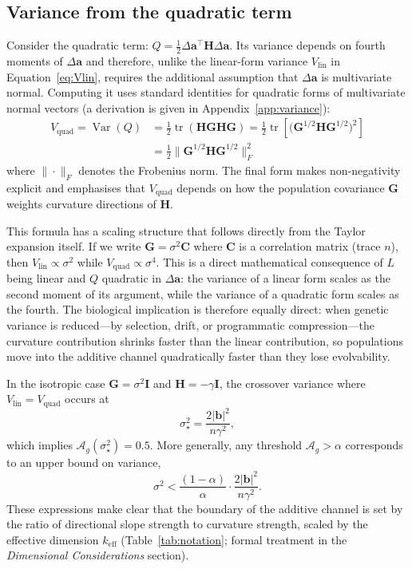 \documentclass[9pt,twocolumn,twoside,lineno]{gsajnl}
\newcommand{\vect}[1]{\boldsymbol{#1}}
\newcommand{\mat}[1]{\mathbf{#1}}
\newcommand{\tr}{\ensuremath{\operatorname{tr}}\xspace}
\newcommand{\Ag}{\ensuremath{\mathcal{A}_{g}}\xspace}
\newcommand{\Vlin}{\ensuremath{V_{\text{lin}}}\xspace}
\newcommand{\Vquad}{\ensuremath{V_{\text{quad}}}\xspace}
\newcommand{\keff}{\ensuremath{k_{\mathrm{eff}}}\xspace}
\newcommand{\Var}{\ensuremath{\operatorname{Var}}\xspace}
\begin{document}
\subsection{Variance from the quadratic term}

Consider the quadratic term: $Q = \tfrac{1}{2}\Delta\vect{a}^\top \mat{H} \Delta\vect{a}$. Its variance depends on fourth moments of $\Delta\vect{a}$ and therefore, unlike the linear-form variance $\Vlin$ in Equation~\eqref{eq:Vlin}, requires the additional assumption that $\Delta\vect{a}$ is multivariate normal. Computing it uses standard identities for quadratic forms of multivariate normal vectors \citep{MathaiProvost1992} (a derivation is given in Appendix~\ref{app:variance}):
\begin{equation}
\begin{split}
\Vquad = \Var(Q) &= \tfrac{1}{2}\tr(\mat{H}\mat{G}\mat{H}\mat{G})
= \tfrac{1}{2}\tr\!\left[\big(\mat{G}^{1/2}\mat{H}\mat{G}^{1/2}\big)^2\right] \\
&= \tfrac{1}{2}\big\|\mat{G}^{1/2}\mat{H}\mat{G}^{1/2}\big\|_F^2
\end{split}
\label{eq:Vquad}
\end{equation}
where $\|\cdot\|_F$ denotes the Frobenius norm. The final form makes non-negativity explicit and emphasises that $\Vquad$ depends on how the population covariance $\mat{G}$ weights curvature directions of $\mat{H}$.

This formula has a scaling structure that follows directly from the Taylor expansion itself. If we write $\mat{G} = \sigma^2 \mat{C}$ where $\mat{C}$ is a correlation matrix (trace $n$), then $\Vlin \propto \sigma^2$ while $\Vquad \propto \sigma^4$. This is a direct mathematical consequence of $L$ being linear and $Q$ quadratic in $\Delta\vect{a}$: the variance of a linear form scales as the second moment of its argument, while the variance of a quadratic form scales as the fourth. The biological implication is therefore equally direct: when genetic variance is reduced---by selection, drift, or programmatic compression---the curvature contribution shrinks faster than the linear contribution, so populations move into the additive channel quadratically faster than they lose evolvability.

In the isotropic case $\mat{G}=\sigma^2\mat{I}$ and $\mat{H}=-\gamma\mat{I}$,
the crossover variance where $\Vlin=\Vquad$ occurs at
\[
\sigma_\star^2=\frac{2|\vect{b}|^2}{n\gamma^2},
\]
which implies $\Ag(\sigma_\star^2)=0.5$. More generally, any threshold
$\Ag>\alpha$ corresponds to an upper bound on variance,
\[
\sigma^2 < \frac{(1-\alpha)}{\alpha}\cdot \frac{2|\vect{b}|^2}{n\gamma^2}.
\]
These expressions make clear that the boundary of the additive channel is set by the ratio of directional slope strength to curvature strength, scaled by the effective dimension $\keff$ (Table~\ref{tab:notation}; formal treatment in the \textit{Dimensional Considerations} section).
\end{document}
